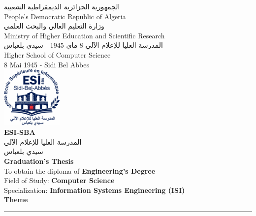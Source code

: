\thispagestyle{empty}

\begin{center}

{\small \textarabic{الجمهورية الجزائرية الديمقراطية الشعبية}} \\[0.1cm]
{\small People's Democratic Republic of Algeria} \\[0.2cm]

{\small \textarabic{وزارة التعليم العالي والبحث العلمي}} \\[0.1cm]
{\small Ministry of Higher Education and Scientific Research} \\[0.2cm]

{\small \textarabic{المدرسة العليا للإعلام الآلي 8 ماي 1945 - سيدي بلعباس}} \\[0.1cm]
{\small Higher School of Computer Science} \\[0.1cm]
{\small 8 Mai 1945 - Sidi Bel Abbes} \\[0.4cm]

\includegraphics[width=3cm]{figures/logos/esi-sba-logo.png} \\[0.3cm]

{\normalsize \textbf{ESI-SBA}} \\[0.1cm]
{\small \textarabic{المدرسة العليا للإعلام الآلي}} \\[0.1cm]
{\small \textarabic{سيدي بلعباس}} \\[0.4cm]

{\Large \textbf{Graduation's Thesis}} \\[0.5cm]

{\normalsize To obtain the diploma of \textbf{Engineering's Degree}} \\[0.2cm]
{\normalsize Field of Study: \textbf{Computer Science}} \\[0.2cm]
{\normalsize Specialization: \textbf{Information Systems Engineering (ISI)}} \\[0.8cm]

{\large \textbf{Theme}} \\[0.3cm]
\rule{10cm}{0.5pt} \\[0.5cm]


\end{center}
